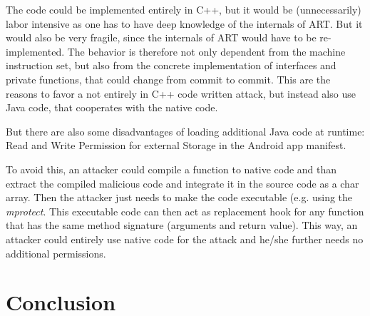 The code could be implemented entirely in C++, but it would be (unnecessarily) labor intensive as one has to have deep knowledge of the internals of ART. But it would also be very fragile, since the internals of ART would have to be re-implemented. The behavior is therefore not only dependent from  the machine instruction set, but also from the concrete implementation of interfaces and private functions, that could change from commit to commit.
This are the reasons to favor a not entirely in C++ code written attack, but instead also use Java code, that cooperates with the native code.

But there are also some disadvantages of loading additional Java code at runtime: Read and Write Permission for external Storage in the Android app manifest. 

 To avoid this, an attacker could compile a function to native code and than extract the compiled malicious code and integrate it in the source code as a char array. Then the attacker just needs to make the code executable (e.g. using the \textit{mprotect}. This executable code can then act as replacement hook for any function that has the same method signature (arguments and return value).
 This way, an attacker could entirely use native code for the attack and he/she further needs no additional permissions.
\section{Conclusion}